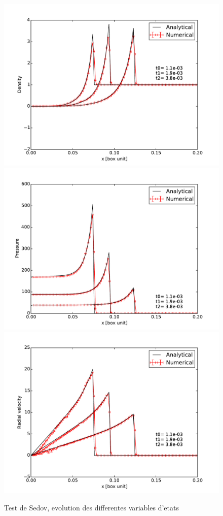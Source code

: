 \begin{figure}[bth]
        \includegraphics[width=.95\linewidth]{img/03/sedov/sedov_evol_8_den_lin.pdf} 
		\includegraphics[width=.95\linewidth]{img/03/sedov/sedov_evol_8_pres.pdf} 
		\includegraphics[width=.95\linewidth]{img/03/sedov/sedov_evol_8_vel.pdf} 
        \caption{Test de Sedov, evolution des differentes variables d'etats}
 		\label{fig:}
\end{figure}


